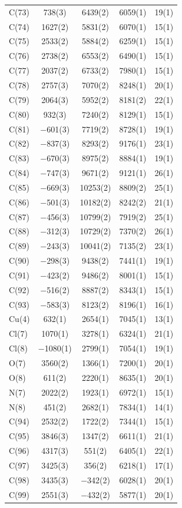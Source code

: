 \begin{center}
{\begin{supertabular}{lcccc}
C(73)&738(3)&6439(2)&6059(1)&19(1)\\
C(74)&1627(2)&5831(2)&6070(1)&15(1)\\
C(75)&2533(2)&5884(2)&6259(1)&15(1)\\
C(76)&2738(2)&6553(2)&6490(1)&15(1)\\
C(77)&2037(2)&6733(2)&7980(1)&15(1)\\
C(78)&2757(3)&7070(2)&8248(1)&20(1)\\
C(79)&2064(3)&5952(2)&8181(2)&22(1)\\
C(80)&932(3)&7240(2)&8129(1)&15(1)\\
C(81)&$-$601(3)&7719(2)&8728(1)&19(1)\\
C(82)&$-$837(3)&8293(2)&9176(1)&23(1)\\
C(83)&$-$670(3)&8975(2)&8884(1)&19(1)\\
C(84)&$-$747(3)&9671(2)&9121(1)&26(1)\\
C(85)&$-$669(3)&10253(2)&8809(2)&25(1)\\
C(86)&$-$501(3)&10182(2)&8242(2)&21(1)\\
C(87)&$-$456(3)&10799(2)&7919(2)&25(1)\\
C(88)&$-$312(3)&10729(2)&7370(2)&26(1)\\
C(89)&$-$243(3)&10041(2)&7135(2)&23(1)\\
C(90)&$-$298(3)&9438(2)&7441(1)&19(1)\\
C(91)&$-$423(2)&9486(2)&8001(1)&15(1)\\
C(92)&$-$516(2)&8887(2)&8343(1)&15(1)\\
C(93)&$-$583(3)&8123(2)&8196(1)&16(1)\\
Cu(4)&632(1)&2654(1)&7045(1)&13(1)\\
Cl(7)&1070(1)&3278(1)&6324(1)&21(1)\\
Cl(8)&$-$1080(1)&2799(1)&7054(1)&19(1)\\
O(7)&3560(2)&1366(1)&7200(1)&20(1)\\
O(8)&611(2)&2220(1)&8635(1)&20(1)\\
N(7)&2022(2)&1923(1)&6972(1)&15(1)\\
N(8)&451(2)&2682(1)&7834(1)&14(1)\\
C(94)&2532(2)&1722(2)&7344(1)&15(1)\\
C(95)&3846(3)&1347(2)&6611(1)&21(1)\\
C(96)&4317(3)&551(2)&6405(1)&22(1)\\
C(97)&3425(3)&356(2)&6218(1)&17(1)\\
C(98)&3435(3)&$-$342(2)&6028(1)&20(1)\\
C(99)&2551(3)&$-$432(2)&5877(1)&20(1)\\

\end{supertabular}}
\end{center}
